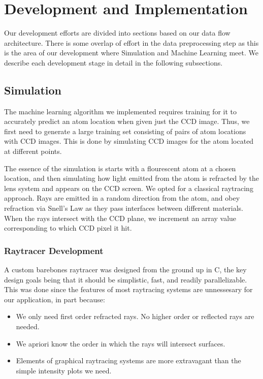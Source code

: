 \section{Development and Implementation}
\label{development}

Our development efforts are divided into sections based on our data flow architecture.  There is some overlap of effort in the data preprocessing step as this is the area of our development where Simulation and Machine Learning meet.  We describe each development stage in detail in the following subsections.

\subsection{Simulation}
The machine learning algorithm we implemented requires training for it to accurately predict an atom location when given just the CCD image. Thus, we first need to generate a large training set consisting of pairs of atom locations with CCD images. This is done by simulating CCD images for the atom located at different points.

The essence of the simulation is starts with a flourescent atom at a chosen location, and then simulating how light emitted from the atom is refracted by the lens system and appears on the CCD screen. We opted for a classical raytracing approach. Rays are emitted in a random direction from the atom, and obey refraction via Snell's Law as they pass interfaces between different materials. When the rays intersect with the CCD plane, we increment an array value corresponding to which CCD pixel it hit.

\subsubsection{Raytracer Development}
A custom barebones raytracer was designed from the ground up in C, the key design goals being that it should be simplistic, fast, and readily parallelizable. This was done since the features of most raytracing systems are unnessesary for our application, in part because:
\begin{itemize}
\item We only need first order refracted rays. No higher order or reflected rays are needed.
\item We apriori know the order in which the rays will intersect surfaces.
\item Elements of graphical raytracing systems are more extravagant than the simple intensity plots we need.
\end{itemize}

